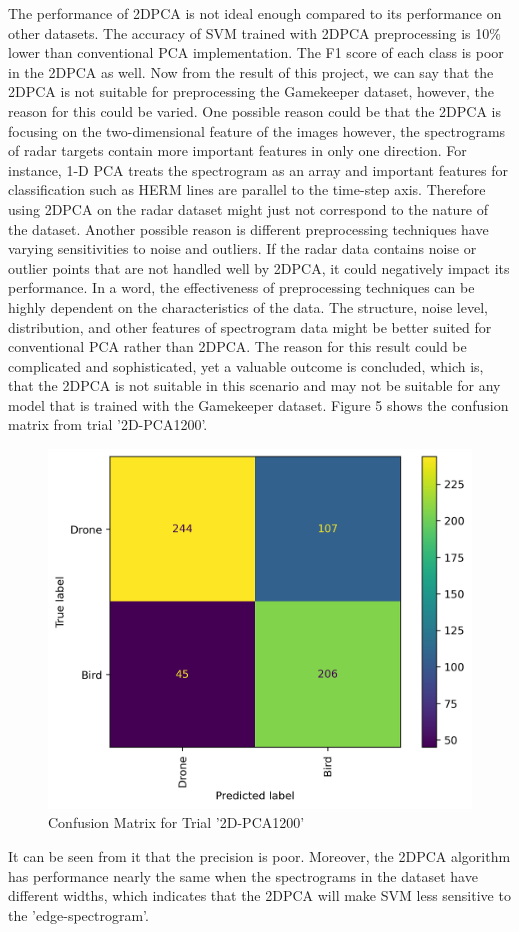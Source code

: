 \documentclass{cta-author}
\begin{document}
The performance of 2DPCA is not ideal enough compared to its performance on other datasets\cite{24}. 
The accuracy of SVM trained with 2DPCA preprocessing is 10\% lower than conventional PCA implementation. 
The F1 score of each class is poor in the 2DPCA as well. 
Now from the result of this project, we can say that the 2DPCA is not suitable for preprocessing the Gamekeeper dataset, however, the reason for this could be varied.
One possible reason could be that the 2DPCA is focusing on the two-dimensional feature of the images however, the spectrograms of radar targets contain more important features in only one direction. For instance, 1-D PCA treats the spectrogram as an array and important features for classification such as HERM lines are parallel to the time-step axis. Therefore using 2DPCA on the radar dataset might just not correspond to the nature of the dataset.
Another possible reason is different preprocessing techniques have varying sensitivities to noise and outliers. If the radar data contains noise or outlier points that are not handled well by 2DPCA, it could negatively impact its performance. 
In a word, the effectiveness of preprocessing techniques can be highly dependent on the characteristics of the data. The structure, noise level, distribution, and other features of spectrogram data might be better suited for conventional PCA rather than 2DPCA.
The reason for this result could be complicated and sophisticated, yet a valuable outcome is concluded, which is, that the 2DPCA is not suitable in this scenario and may not be suitable for any model that is trained with the Gamekeeper dataset.
Figure 5 shows the confusion matrix from trial '2D-PCA1200'. 
\begin{figure}[h]
\centering\includegraphics[scale = 0.5]{Image/2DPCA_with1201binCFM60.png}
\caption{Confusion Matrix for Trial '2D-PCA1200'}
\end{figure}
It can be seen from it that the precision is poor.
Moreover, the 2DPCA algorithm has performance nearly the same when the spectrograms in the dataset have different widths, which indicates that the 2DPCA will make SVM less sensitive to the 'edge-spectrogram'. 
\end{document}
